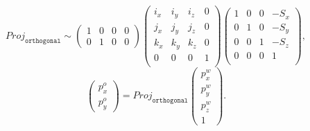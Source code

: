 \documentclass[a4paper]{article}
\begin{document}
\[
    \mathit{Proj}_\mathtt{orthogonal} \sim
    \begin{pmatrix}
        1 & 0 & 0 & 0 \\ 0 & 1 & 0 & 0
    \end{pmatrix}
    \begin{pmatrix}
        i_x & i_y & i_z & 0 \\
        j_x & j_y & j_z & 0 \\
        k_x & k_y & k_z & 0 \\
        0   & 0   & 0   & 1 \\
    \end{pmatrix}
    \begin{pmatrix}
        1 & 0 & 0 & -S_x \\
        0 & 1 & 0 & -S_y \\
        0 & 0 & 1 & -S_z \\
        0 & 0 & 0 & 1 \\
    \end{pmatrix}, \]
\[
    \begin{pmatrix} p_x^o \\ p_y^o \end{pmatrix} =
        \mathit{Proj}_\mathtt{orthogonal}
        \begin{pmatrix} p_x^w \\ p_y^w \\ p_z^w \\ 1 \end{pmatrix}.
    \]
\end{document}
